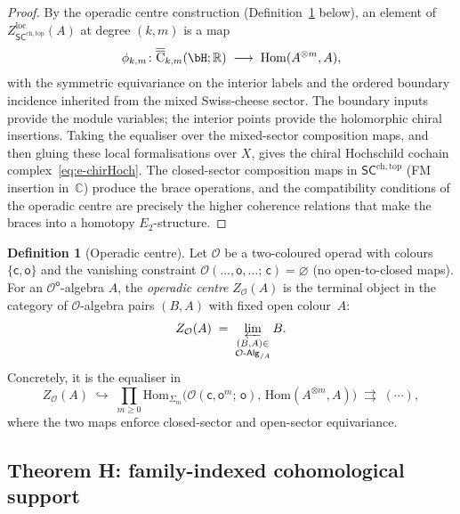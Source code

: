 \documentclass[11pt,reqno]{amsart}
\theoremstyle{definition}
\newtheorem{definition}[theorem]{Definition}
\theoremstyle{remark}
\providecommand{\cO}{\mathcal{O}}
\providecommand{\FM}{\overline{\mathrm{C}}}
\providecommand{\Etwo}{E_2}
\providecommand{\SCchtop}{\ensuremath{\mathsf{SC}^{\mathrm{ch,top}}}}
\providecommand{\bC}{\mathbb{C}}
\providecommand{\bR}{\mathbb{R}}
\providecommand{\Hom}{\mathrm{Hom}}
\begin{document}
\begin{proof}
By the operadic centre construction
(Definition~\ref{def:e-operadic-centre} below), an element
of \(Z_{\SCchtop}^{\mathrm{loc}}(A)\) at degree \((k,m)\) is a map
\[
\phi_{k,m}\colon
\overline{\FM}_{k,m}(\bH;\bR) \;\longrightarrow\;
\Hom(A^{\otimes m}, A),
\]
with the symmetric equivariance on the interior labels and the ordered
boundary incidence inherited from the mixed Swiss-cheese sector. The
boundary inputs provide the module variables; the interior points
provide the holomorphic chiral insertions. Taking the equaliser over
the mixed-sector composition maps, and then gluing these local
formalisations over \(X\), gives the chiral Hochschild cochain
complex~\eqref{eq:e-chirHoch}.
The closed-sector composition maps in $\SCchtop$ (FM insertion
in~$\bC$) produce the brace operations, and the compatibility
conditions of the operadic centre are precisely the higher
coherence relations that make the braces into a homotopy
$\Etwo$-structure.
\end{proof}

\begin{definition}[Operadic centre]
\label{def:e-operadic-centre}
Let $\cO$ be a two-coloured operad with colours
$\{\mathsf{c}, \mathsf{o}\}$ and the vanishing constraint
$\cO(\ldots, \mathsf{o}, \ldots;\, \mathsf{c}) = \varnothing$
(no open-to-closed maps). For an
$\cO^{\mathsf{o}}$-algebra $A$, the \emph{operadic centre}
$Z_\cO(A)$ is the terminal object in the category of
$\cO$-algebra pairs $(B, A)$ with fixed open colour~$A$:
\[
Z_\cO(A) \;=\;
\varprojlim_{\substack{(B,A) \in \\
\cO\text{-}\mathsf{Alg}_{/A}}} B.
\]
Concretely, it is the equaliser in
\[
Z_\cO(A) \;\hookrightarrow\;
\prod_{m \ge 0}
\Hom_{\Sigma_m}\!\bigl(
\cO(\mathsf{c}, \mathsf{o}^m;\, \mathsf{o}),\,
\Hom(A^{\otimes m}, A)\bigr)
\;\rightrightarrows\; (\cdots),
\]
where the two maps enforce closed-sector and open-sector
equivariance.
\end{definition}

\subsection{Theorem H: family-indexed cohomological support}
\end{document}
